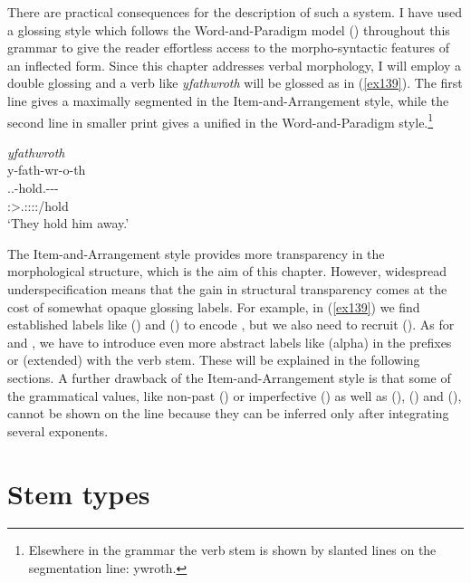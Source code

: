 There are practical consequences for the description of such a system. I have used a glossing style which follows the Word-and-Paradigm model (\citealt[67]{Matthews:1979vm}) throughout this grammar to give the reader effortless access to the morpho-syntactic features of an inflected  form. Since this chapter addresses verbal morphology, I will employ a double glossing and a verb like \emph{yfathwroth} will be glossed as in (\ref{ex139}). The first line gives a maximally segmented  in the Item-and-Arrangement style, while the second line in smaller print gives a unified  in the Word-and-Paradigm style.\footnote{Elsewhere in the grammar the verb stem is shown by slanted lines  on the segmentation line: ywroth.}

\begin{exe}
	\ex \emph{yfathwroth}\\
	\glll y-fath-wr-o-th\\
	\Tsg.\Masc.\Alph-hold.\Ext-\Ndu-\Andat-\Stnsg\\
	\footnotesize{\Stpl:\Sbj>\Tsg.\Masc:\Obj:\Nonpast:\Ipfv:\Andat/hold}\\
	\trans `They hold him away.'
	\label{ex139}
\end{exe}

The Item-and-Arrangement style provides more transparency in the morphological structure, which is the aim of this chapter. However, widespread underspecification means that the gain in structural transparency comes at the cost of somewhat opaque glossing labels. For example, in (\ref{ex139}) we find established labels like {\Sg} () and {\Nsg} () to encode , but we also need to recruit {\Ndu} (). As for  and , we have to introduce even more abstract labels like \Alph{} (alpha) in the prefixes or {\Ext} (extended) with the verb stem. These will be explained in the following sections. A further drawback of the Item-and-Arrangement style is that some of the grammatical values, like non-past (\Nonpast) or imperfective (\Ipfv) as well as  (\Sbj),  (\Obj) and  (\Io), cannot be shown on the  line because they can be inferred only after integrating several exponents.

\section{Stem types} \label{roots-and-temp}

